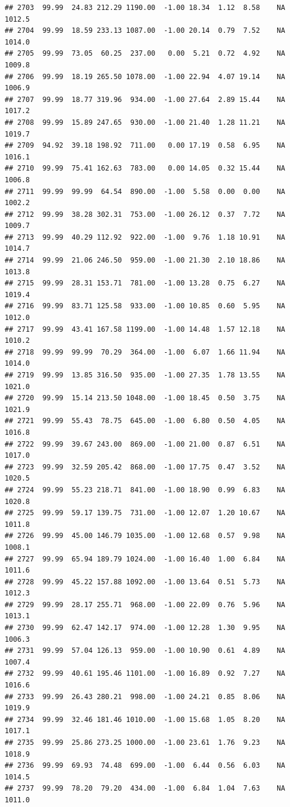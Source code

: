 \documentclass{article}\usepackage{graphicx, color}
\makeatletter
\newenvironment{kframe}{%
 \def\at@end@of@kframe{}%
 \ifinner\ifhmode%
  \def\at@end@of@kframe{\end{minipage}}%
  \begin{minipage}{\columnwidth}%
 \fi\fi%
 \def\FrameCommand##1{\hskip\@totalleftmargin \hskip-\fboxsep
 \colorbox{shadecolor}{##1}\hskip-\fboxsep
     \hskip-\linewidth \hskip-\@totalleftmargin \hskip\columnwidth}%
 \MakeFramed {\advance\hsize-\width
   \@totalleftmargin\z@ \linewidth\hsize
   \@setminipage}}%
 {\par\unskip\endMakeFramed%
 \at@end@of@kframe}
\newenvironment{knitrout}{}{} %
\makeatother
\begin{document}
\begin{knitrout}
\begin{kframe}
\begin{verbatim}
## 2703  99.99  24.83 212.29 1190.00  -1.00 18.34  1.12  8.58    NA 1012.5
## 2704  99.99  18.59 233.13 1087.00  -1.00 20.14  0.79  7.52    NA 1014.0
## 2705  99.99  73.05  60.25  237.00   0.00  5.21  0.72  4.92    NA 1009.8
## 2706  99.99  18.19 265.50 1078.00  -1.00 22.94  4.07 19.14    NA 1006.9
## 2707  99.99  18.77 319.96  934.00  -1.00 27.64  2.89 15.44    NA 1017.2
## 2708  99.99  15.89 247.65  930.00  -1.00 21.40  1.28 11.21    NA 1019.7
## 2709  94.92  39.18 198.92  711.00   0.00 17.19  0.58  6.95    NA 1016.1
## 2710  99.99  75.41 162.63  783.00   0.00 14.05  0.32 15.44    NA 1006.8
## 2711  99.99  99.99  64.54  890.00  -1.00  5.58  0.00  0.00    NA 1002.2
## 2712  99.99  38.28 302.31  753.00  -1.00 26.12  0.37  7.72    NA 1009.7
## 2713  99.99  40.29 112.92  922.00  -1.00  9.76  1.18 10.91    NA 1014.7
## 2714  99.99  21.06 246.50  959.00  -1.00 21.30  2.10 18.86    NA 1013.8
## 2715  99.99  28.31 153.71  781.00  -1.00 13.28  0.75  6.27    NA 1019.4
## 2716  99.99  83.71 125.58  933.00  -1.00 10.85  0.60  5.95    NA 1012.0
## 2717  99.99  43.41 167.58 1199.00  -1.00 14.48  1.57 12.18    NA 1010.2
## 2718  99.99  99.99  70.29  364.00  -1.00  6.07  1.66 11.94    NA 1014.0
## 2719  99.99  13.85 316.50  935.00  -1.00 27.35  1.78 13.55    NA 1021.0
## 2720  99.99  15.14 213.50 1048.00  -1.00 18.45  0.50  3.75    NA 1021.9
## 2721  99.99  55.43  78.75  645.00  -1.00  6.80  0.50  4.05    NA 1016.8
## 2722  99.99  39.67 243.00  869.00  -1.00 21.00  0.87  6.51    NA 1017.0
## 2723  99.99  32.59 205.42  868.00  -1.00 17.75  0.47  3.52    NA 1020.5
## 2724  99.99  55.23 218.71  841.00  -1.00 18.90  0.99  6.83    NA 1020.8
## 2725  99.99  59.17 139.75  731.00  -1.00 12.07  1.20 10.67    NA 1011.8
## 2726  99.99  45.00 146.79 1035.00  -1.00 12.68  0.57  9.98    NA 1008.1
## 2727  99.99  65.94 189.79 1024.00  -1.00 16.40  1.00  6.84    NA 1011.6
## 2728  99.99  45.22 157.88 1092.00  -1.00 13.64  0.51  5.73    NA 1012.3
## 2729  99.99  28.17 255.71  968.00  -1.00 22.09  0.76  5.96    NA 1013.1
## 2730  99.99  62.47 142.17  974.00  -1.00 12.28  1.30  9.95    NA 1006.3
## 2731  99.99  57.04 126.13  959.00  -1.00 10.90  0.61  4.89    NA 1007.4
## 2732  99.99  40.61 195.46 1101.00  -1.00 16.89  0.92  7.27    NA 1016.6
## 2733  99.99  26.43 280.21  998.00  -1.00 24.21  0.85  8.06    NA 1019.9
## 2734  99.99  32.46 181.46 1010.00  -1.00 15.68  1.05  8.20    NA 1017.1
## 2735  99.99  25.86 273.25 1000.00  -1.00 23.61  1.76  9.23    NA 1018.9
## 2736  99.99  69.93  74.48  699.00  -1.00  6.44  0.56  6.03    NA 1014.5
## 2737  99.99  78.20  79.20  434.00  -1.00  6.84  1.04  7.63    NA 1011.0

\end{verbatim}
\end{kframe}
\end{knitrout}
\end{document}
